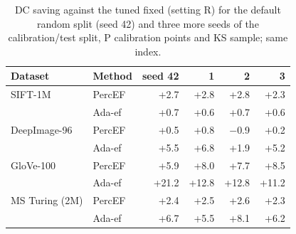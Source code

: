 \begin{table}[t]
  \caption{DC saving against the tuned fixed \ef{} (setting R) for the default random split (seed 42) and three more seeds of the calibration/test split, P calibration points and KS sample; same index.}
  \label{tab:vj-seeds}
  \centering\footnotesize\setlength{\tabcolsep}{3.5pt}
  \begin{tabular}{llrrrr}
    \toprule
    Dataset & Method & seed 42 & 1 & 2 & 3 \\
    \midrule
    SIFT-1M & PercEF & +2.7 & +2.8 & +2.8 & +2.3 \\
     & Ada-ef & +0.7 & +0.6 & +0.7 & +0.6 \\
    DeepImage-96 & PercEF & +0.5 & +0.8 & $-$0.9 & +0.2 \\
     & Ada-ef & +5.5 & +6.8 & +1.9 & +5.2 \\
    GloVe-100 & PercEF & +5.9 & +8.0 & +7.7 & +8.5 \\
     & Ada-ef & +21.2 & +12.8 & +12.8 & +11.2 \\
    MS Turing (2M) & PercEF & +2.4 & +2.5 & +2.6 & +2.3 \\
     & Ada-ef & +6.7 & +5.5 & +8.1 & +6.2 \\
    \bottomrule
  \end{tabular}
\end{table}
